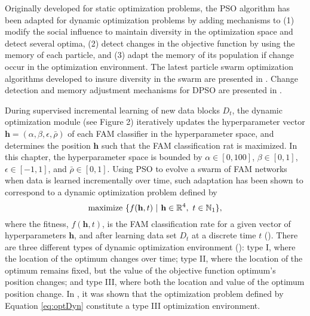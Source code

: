 Originally developed for static optimization problems, the PSO algorithm has been adapted for dynamic optimization problems by adding mechanisms to (1) modify the social influence to maintain diversity in the optimization space and detect several optima, (2) detect changes in the objective function by using the memory of each particle, and (3) adapt the memory of its population if change occur in the optimization environment.
The latest particle swarm optimization algorithms developed to insure diversity in the swarm are presented in \cite{du08, li06, nickabadi08_2, ozcan07}.
Change detection and memory adjustment mechanisms for DPSO are presented in \cite{blackwell04, carlisle02, hu02, wang07}.

During supervised incremental learning of new data blocks $D_t$, the dynamic optimization module (see Figure 2) iteratively updates the hyperparameter vector $\textbf{h}=\left(\alpha, \beta, \epsilon, \bar{\rho}\right)$ of each FAM classifier in the hyperparameter space, and determines the position $\textbf{h}$ such that the FAM classification rat is maximized.
In this chapter, the hyperparameter space is bounded by $\alpha \in \left[0,100\right]$, $\beta \in \left[0,1\right]$, $\epsilon \in \left[-1,1\right]$, and $\bar{\rho} \in \left[0,1\right]$.
Using PSO to evolve a swarm of FAM networks when data is learned incrementally over time, such adaptation has been shown to correspond to a dynamic optimization problem defined by  
\begin{equation}
	\textnormal{maximize }\{ f(\textbf{h},t)\ |\ \textbf{h}\in\mathbb{R}^4,
																             \ t\in\mathbb{N}_1 \},
	\label{eq:optDyn}
\end{equation}
where the fitness, $f(\textbf{h},t)$, is the FAM classification rate for a given vector of hyperparameters $\textbf{h}$, and after learning data set $D_t$ at a discrete time $t$ (\cite{connolly10}).
There are three different types of dynamic optimization environment (\cite{engelbrecht05}): type I, where the location of the optimum changes over time; type II, where the location of the optimum remains fixed, but the value of the objective function optimum's position changes; and type III, where both the location and value of the optimum position change.
In \cite{connolly10}, it was shown that the optimization problem defined by Equation \ref{eq:optDyn} constitute a type III optimization environment.

